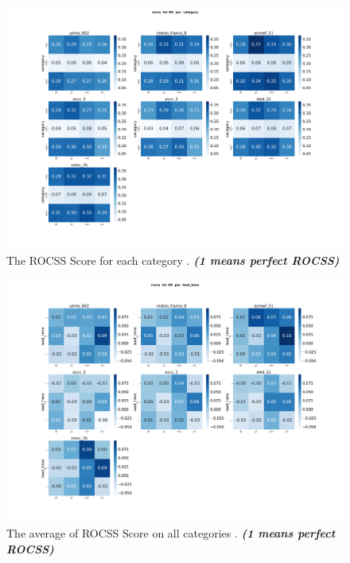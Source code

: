 \begin{figure}[H]
    \centering
    \includegraphics[scale=0.25]{plots/prob/rocss/rocss_RR_category.png}
    \caption{The ROCSS Score for each category  . \textbf{\textit{(1 means perfect ROCSS)}}}
\end{figure}


\begin{figure}[H]
    \centering
    \includegraphics[scale=0.25]{plots/prob/rocss/rocss_RR_lead_time.png}
    \caption{The average of  ROCSS Score on all categories    . \textbf{\textit{(1 means perfect ROCSS)}}}
\end{figure}



